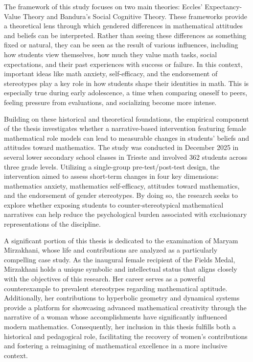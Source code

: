 The framework of this study focuses on two main theories: Eccles' Expectancy-Value Theory and Bandura's Social Cognitive Theory. These frameworks provide a theoretical lens through which gendered differences in mathematical attitudes and beliefs can be interpreted. Rather than seeing these differences as something fixed or natural, they can be seen as the result of various influences, including how students view themselves, how much they value math tasks, social expectations, and their past experiences with success or failure.
In this context, important ideas like math anxiety, self-efficacy, and the endorsement of stereotypes play a key role in how students shape their identities in math. This is especially true during early adolescence, a time when comparing oneself to peers, feeling pressure from evaluations, and socializing become more intense.

Building on these historical and theoretical foundations, the empirical component of the thesis investigates whether a narrative-based intervention featuring female mathematical role models can lead to measurable changes in students' beliefs and attitudes toward mathematics. The study was conducted in December 2025 in several lower secondary school classes in Trieste and involved 362 students across three grade levels. Utilizing a single-group pre-test/post-test design, the intervention aimed to assess short-term changes in four key dimensions: mathematics anxiety, mathematics self-efficacy, attitudes toward mathematics, and the endorsement of gender stereotypes. By doing so, the research seeks to explore whether exposing students to counter-stereotypical mathematical narratives can help reduce the psychological burden associated with exclusionary representations of the discipline.

A significant portion of this thesis is dedicated to the examination of Maryam Mirzakhani, whose life and contributions are analyzed as a particularly compelling case study. As the inaugural female recipient of the Fields Medal, Mirzakhani holds a unique symbolic and intellectual status that aligns closely with the objectives of this research. Her career serves as a powerful counterexample to prevalent stereotypes regarding mathematical aptitude. Additionally, her contributions to hyperbolic geometry and dynamical systems provide a platform for showcasing advanced mathematical creativity through the narrative of a woman whose accomplishments have significantly influenced modern mathematics. Consequently, her inclusion in this thesis fulfills both a historical and pedagogical role, facilitating the recovery of women's contributions and fostering a reimagining of mathematical excellence in a more inclusive context.


